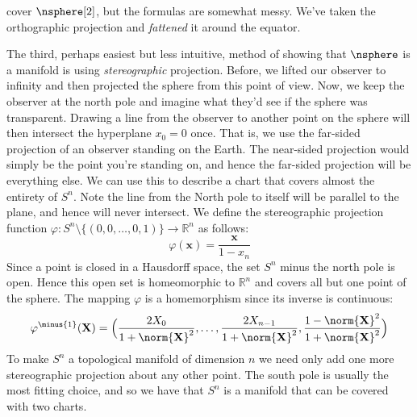 \documentclass{article}                                                        %
\begin{document}
        cover $\nsphere[2]$, but the formulas are somewhat messy. We've taken
        the orthographic projection and \textit{fattened} it around the equator.
        \begin{example}
            The third, perhaps easiest but less intuitive, method of showing
            that $\nsphere$ is a manifold is using \textit{stereographic}
            projection. Before, we lifted our observer to infinity and then
            projected the sphere from this point of view. Now, we keep the
            observer at the north pole and imagine what they'd see if the sphere
            was transparent. Drawing a line from the observer to another point
            on the sphere will then intersect the hyperplane $x_{0}=0$ once.
            That is, we use the far-sided projection of an observer standing on
            the Earth. The near-sided projection would simply be the point
            you're standing on, and hence the far-sided projection will be
            everything else. We can use this to describe a chart that covers
            almost the entirety of $S^{n}$. Note the line from the North pole to
            itself will be parallel to the plane, and hence will never
            intersect. We define the stereographic projection function
            $\varphi:S^{n}\setminus\{(0,0,\dots,0,1)\}\rightarrow\mathbb{R}^{n}$
            as follows:
            \begin{equation}
                \varphi(\mathbf{x})=\frac{\mathbf{x}}{1-x_{n}}
            \end{equation}
            Since a point is closed in a Hausdorff space, the set $S^{n}$ minus
            the north pole is open. Hence this open set is homeomorphic to
            $\mathbb{R}^{n}$ and covers all but one point of the sphere. The
            mapping $\varphi$ is a homemorphism since its inverse is continuous:
            \begin{equation}
                \varphi^{\minus{1}}(\mathbf{X})=\Big(
                    \frac{2X_{0}}{1+\norm{\mathbf{X}}^{2}},\dots,
                    \frac{2X_{n-1}}{1+\norm{\mathbf{X}}^{2}},
                    \frac{1-\norm{\mathbf{X}}^{2}}{1+\norm{\mathbf{X}}^{2}}\Big)
            \end{equation}
            To make $S^{n}$ a topological manifold of dimension $n$ we need only
            add one more stereographic projection about any other point. The
            south pole is usually the most fitting choice, and so we have that
            $S^{n}$ is a manifold that can be covered with two charts.
        \end{example}
\end{document}
